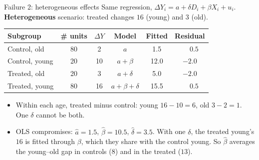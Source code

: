 \documentclass[
  11pt,
  ignorenonframetext,
  aspectratio=169,
]{beamer}
\providecommand{\tightlist}{%
  \setlength{\itemsep}{0pt}\setlength{\parskip}{0pt}}
\begin{document}
\begin{frame}{Failure 2: heterogeneous effects}
\protect{}\label{failure-2-heterogeneous-effects}
Same regression, \(\Delta Y_i = a + \delta D_i + \beta X_i + u_i\).
\textbf{Heterogeneous} scenario: treated changes \(16\) (young) and
\(3\) (old).

\begin{center}\small
\begin{tabular}{lccccc}
\toprule
Subgroup & \# units & $\Delta Y$ & Model & Fitted & Residual \\
\midrule
Control, old & 80 & 2 & $a$ & 1.5 & $\phantom{-}0.5$ \\
Control, young & 20 & 10 & $a + \beta$ & 12.0 & $-2.0$ \\
Treated, old & 20 & 3 & $a + \delta$ & 5.0 & $-2.0$ \\
Treated, young & 80 & 16 & $a + \beta + \delta$ & 15.5 & $\phantom{-}0.5$ \\
\bottomrule
\end{tabular}
\end{center}

\begin{itemize}
\tightlist
\item
  Within each age, treated minus control: young \(16 - 10 = 6\), old
  \(3 - 2 = 1\). One \(\delta\) cannot be both.
\item
  OLS compromises: \(\hat a = 1.5\), \(\hat\beta = 10.5\),
  \(\hat\delta = 3.5\). With one \(\delta\), the treated young's \(16\)
  is fitted through \(\beta\), which they share with the control young.
  So \(\hat\beta\) averages the young--old gap in controls (\(8\)) and
  in the treated (\(13\)).
\end{itemize}
\end{frame}
\end{document}
